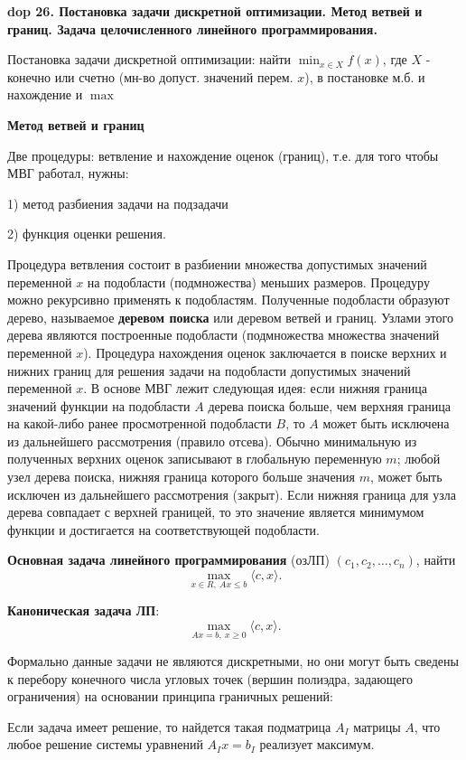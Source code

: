 \textbf{\LARGE dop 26. Постановка задачи дискретной оптимизации. Метод ветвей и границ. Задача целочисленного линейного программирования.}

Постановка задачи дискретной оптимизации: найти $\min_{x \in X} f(x)$, где $X$ - конечно или счетно (мн-во допуст. значений перем. $x$), в постановке м.б. и нахождение и $\max$

\textbf{Метод ветвей и границ}

Две процедуры: ветвление и нахождение оценок (границ), т.е. для того чтобы МВГ работал, нужны: 

1) метод разбиения задачи на подзадачи 

2) функция оценки решения.

Процедура ветвления состоит в разбиении множества допустимых значений переменной $x$ на подобласти (подмножества) меньших размеров. 
Процедуру можно рекурсивно применять к подобластям. 
Полученные подобласти образуют дерево, называемое \textbf{деревом поиска} или деревом ветвей и границ. Узлами этого дерева являются построенные подобласти (подмножества множества значений переменной $x$). 
Процедура нахождения оценок заключается в поиске верхних и нижних границ для решения задачи на подобласти допустимых значений переменной $x$. В основе МВГ лежит следующая идея: если нижняя граница значений функции на подобласти $A$ дерева поиска больше, чем верхняя граница на какой-либо ранее просмотренной подобласти $B$, то $A$ может быть исключена из дальнейшего рассмотрения (правило отсева). 
Обычно минимальную из полученных верхних оценок записывают в глобальную переменную $m$; любой узел дерева поиска, нижняя граница которого больше значения $m$, может быть исключен из дальнейшего рассмотрения (закрыт). 
Если нижняя граница для узла дерева совпадает с верхней границей, то это значение является минимумом функции и достигается на соответствующей подобласти.

\textbf{Основная задача линейного программирования} (озЛП) $(c_1, c_2, \dots , c_n)$, найти 
$$\max_{x \in R,~Ax \leqslant b} \langle c, x \rangle.$$

\textbf{Каноническая задача ЛП}: 
$$\max_{Ax = b,~x \geqslant 0} \langle c, x \rangle.$$

Формально данные задачи не являются дискретными, но они могут быть сведены к перебору конечного числа угловых точек (вершин полиэдра, задающего ограничения) на основании принципа граничных решений:

Если задача имеет решение, то найдется такая подматрица $A_I$ матрицы $A$, что любое решение системы уравнений $A_Ix = b_I$ реализует максимум.

